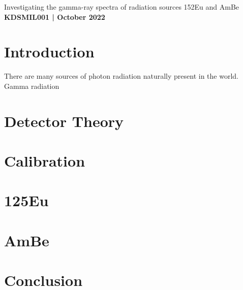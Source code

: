 \documentclass[11pt]{article}
\numberwithin{equation}{section}
\numberwithin{figure}{section}
\numberwithin{table}{section}
\begin{document}
\begin{center}
    {\huge Investigating the gamma-ray spectra of radiation sources 152Eu and AmBe}\\
    \vspace{0.2in}
    \textbf{KDSMIL001 | October 2022}
\end{center}


\section{Introduction}\label{sec:Introduction}
There are many sources of photon radiation naturally present in the world. Gamma radiation

\section{Detector Theory}\label{sec:Theory}

\section{Calibration}\label{sec:Calibration}

\section{125Eu}\label{sec:Eu}

\section{AmBe}\label{sec:AmBe}

\section{Conclusion}\label{sec:Conclusion}
\end{document}
